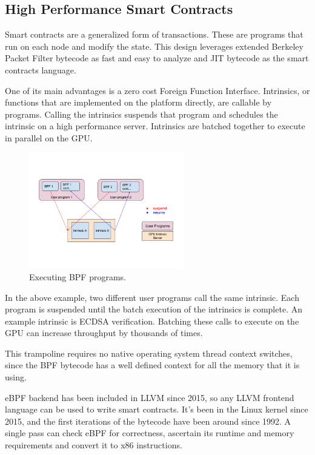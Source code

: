 \documentclass[12pt]{ltjsarticle}
\begin{document}
\subsection{High Performance Smart Contracts}\label{sec:smartcontracts}

Smart contracts are a generalized form of transactions. These are programs that run on each node and modify the state. This design leverages extended Berkeley Packet Filter bytecode as fast and easy to analyze and JIT bytecode as the smart contracts language.

One of its main advantages is a zero cost Foreign Function Interface. Intrinsics, or  functions that are implemented on the platform directly, are callable by  programs. Calling the intrinsics suspends that program and schedules the intrinsic on a high performance server. Intrinsics are batched together to execute in parallel on the GPU.

\begin{figure}
  \begin{center}
    \centering
    \includegraphics[width=0.6\textwidth]{../../figures/fig_11.png}
    \caption[Fig 11]{Executing  BPF programs.\label{fig_11}}
  \end{center}
  \end{figure}

In the above example, two different user programs call the same intrinsic. Each program is suspended until the batch execution of the intrinsics is complete. An example intrinsic is ECDSA verification. Batching these calls to execute on the GPU can increase throughput by thousands of times.

This trampoline requires no native operating system thread context switches, since the BPF bytecode has a well defined context for all the memory that it is using.

eBPF backend has been included in LLVM since 2015, so any LLVM frontend language can be used to write smart contracts. It’s been in the Linux kernel since 2015, and the first iterations of the bytecode have been around since 1992. A single pass can check eBPF for correctness, ascertain its runtime and memory requirements and convert it to x86 instructions.
\end{document}
